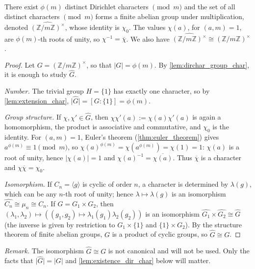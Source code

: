 \begin{proposition}
    \label{prop:number_dir_char}
    There exist $\phi(m)$ distinct Dirichlet characters $\pmod m$ and the set of all distinct characters $\pmod m$ forms a finite abelian group under multiplication, denoted $\widehat{\left(\mathbb{Z}/m \mathbb{Z}\right)^{\times}}$, whose identity is $\chi_0$. The values $\chi(a)$, for $(a,m) = 1$, are $\phi(m)$-th roots of unity, so $\chi^{-1} = \overline{\chi}$. We also have $\widehat{\left(\mathbb{Z}/m \mathbb{Z}\right)^{\times}} \cong\left(\mathbb{Z}/m \mathbb{Z}\right)^{\times}$.
\end{proposition}
\begin{proof}
    Let $G = \left(\mathbb{Z}/m\mathbb{Z}\right)^\times$, so that $\lvert G\rvert = \phi(m)$. By \cref{lem:dirchar_group_char}, it is enough to study $\widehat G$.

    \emph{Number.} The trivial group $H = \{1\}$ has exactly one character, so by \cref{lem:extension_char}, $\lvert\widehat G\rvert = [G:\{1\}] = \phi(m)$.

    \emph{Group structure.} If $\chi,\chi'\in\widehat G$, then $\chi\chi'(a) := \chi(a)\chi'(a)$ is again a homomorphism, the product is associative and commutative, and $\chi_0$ is the identity. For $(a,m)=1$, Euler's theorem (\cref{thm:euler_theorem}) gives $a^{\phi(m)}\equiv1\pmod m$, so $\chi(a)^{\phi(m)} = \chi(a^{\phi(m)}) = \chi(1) = 1$: $\chi(a)$ is a root of unity, hence $\lvert\chi(a)\rvert = 1$ and $\chi(a)^{-1} = \overline{\chi(a)}$. Thus $\overline\chi$ is a character and $\chi\overline\chi = \chi_0$.

    \emph{Isomorphism.} If $C_n = \langle g\rangle$ is cyclic of order $n$, a character is determined by $\lambda(g)$, which can be any $n$-th root of unity; hence $\lambda \mapsto \lambda(g)$ is an isomorphism $\widehat{C_n}\cong\mu_n\cong C_n$. If $G = G_1\times G_2$, then $(\lambda_1,\lambda_2)\mapsto \left((g_1,g_2)\mapsto\lambda_1(g_1)\lambda_2(g_2)\right)$ is an isomorphism $\widehat{G_1}\times\widehat{G_2}\cong \widehat{G}$ (the inverse is given by restriction to $G_1\times\{1\}$ and $\{1\}\times G_2$). By the structure theorem of finite abelian groups, $G$ is a product of cyclic groups, so $\widehat G\cong G$.
\end{proof}
\noindent\emph{Remark.} The isomorphism $\widehat G\cong G$ is not canonical and will not be used. Only the facts that $\lvert\widehat G\rvert = \lvert G\rvert$ and \cref{lem:existence_dir_char} below will matter.

